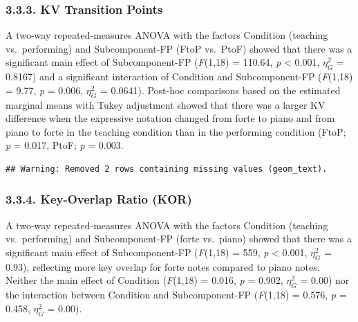 \documentclass[
  english,
  man,floatsintext]{apa6}
\begin{document}
\hypertarget{kv-transition-points-1}{%
\subsubsection{3.3.3. KV Transition Points}\label{kv-transition-points-1}}

A two-way repeated-measures ANOVA with the factors Condition (teaching vs.~performing) and Subcomponent-FP (FtoP vs.~PtoF) showed that there was a significant main effect of Subcomponent-FP (\emph{F}(1,18) = 110.64, \emph{p} \textless{} 0.001, \(\eta_G^2\) = 0.8167) and a significant interaction of Condition and Subcomponent-FP (\emph{F}(1,18) = 9.77, \emph{p} = 0.006, \(\eta_G^2\) = 0.0641). Post-hoc comparisons based on the estimated marginal means with Tukey adjustment showed that there was a larger KV difference when the expressive notation changed from forte to piano and from piano to forte in the teaching condition than in the performing condition (FtoP; \emph{p} = 0.017, PtoF; \emph{p} = 0.003.

\begin{verbatim}
## Warning: Removed 2 rows containing missing values (geom_text).
\end{verbatim}

\hypertarget{key-overlap-ratio-kor-1}{%
\subsubsection{3.3.4. Key-Overlap Ratio (KOR)}\label{key-overlap-ratio-kor-1}}

A two-way repeated-measures ANOVA with the factors Condition (teaching vs.~performing) and Subcomponent-FP (forte vs.~piano) showed that there was a significant main effect of Subcomponent-FP (\emph{F}(1,18) = 559, \emph{p} \textless{} 0.001, \(\eta_G^2\) = 0.93), reflecting more key overlap for forte notes compared to piano notes. Neither the main effect of Condition (\emph{F}(1,18) = 0.016, \emph{p} = 0.902, \(\eta_G^2\) = 0.00) nor the interaction between Condition and Subcomponent-FP (\emph{F}(1,18) = 0.576, \emph{p} = 0.458, \(\eta_G^2\) = 0.00).
\end{document}
